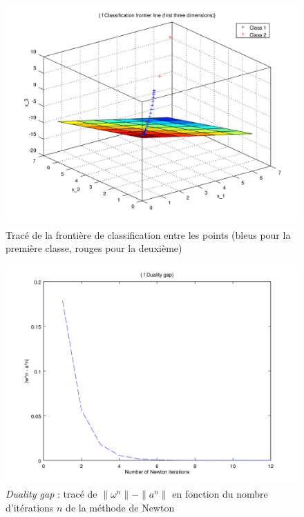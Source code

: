 \documentclass{article}
\begin{document}
         \begin{figure}
           \begin{center}
             \subfigure\includegraphics[scale=0.5]{images/plane5.png}
             \caption{Tracé de la frontière de classification entre les points (bleus pour la première classe, rouges pour la deuxième)}
           \end{center}
         \end{figure}

         \begin{figure}
           \begin{center}
             \subfigure\includegraphics[scale=0.5]{images/duality5.png}
             \caption{\emph{Duality gap} : tracé de $\|\omega^n\| - \|a^n\|$ en fonction du nombre d'itérations $n$ de la méthode de Newton}
           \end{center}
         \end{figure}
\end{document}
